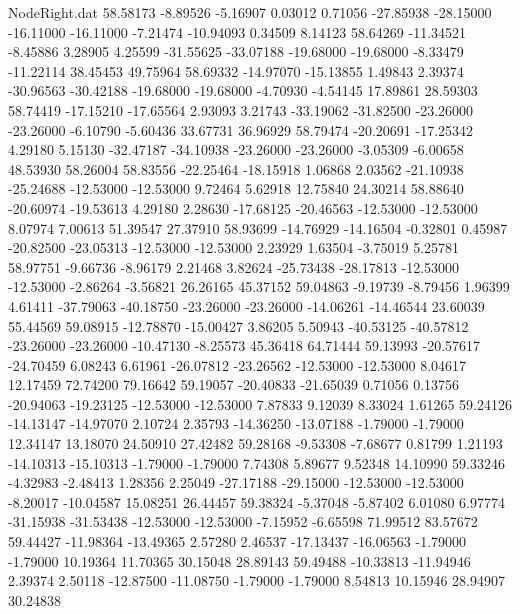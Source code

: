 \begin{filecontents}{NodeRight.dat}
  58.58173   -8.89526   -5.16907     0.03012    0.71056  -27.85938  -28.15000  -16.11000  -16.11000   -7.21474  -10.94093    0.34509    8.14123
  58.64269  -11.34521   -8.45886     3.28905    4.25599  -31.55625  -33.07188  -19.68000  -19.68000   -8.33479  -11.22114   38.45453   49.75964
  58.69332  -14.97070  -15.13855     1.49843    2.39374  -30.96563  -30.42188  -19.68000  -19.68000   -4.70930   -4.54145   17.89861   28.59303
  58.74419  -17.15210  -17.65564     2.93093    3.21743  -33.19062  -31.82500  -23.26000  -23.26000   -6.10790   -5.60436   33.67731   36.96929
  58.79474  -20.20691  -17.25342     4.29180    5.15130  -32.47187  -34.10938  -23.26000  -23.26000   -3.05309   -6.00658   48.53930   58.26004
  58.83556  -22.25464  -18.15918     1.06868    2.03562  -21.10938  -25.24688  -12.53000  -12.53000    9.72464    5.62918   12.75840   24.30214
  58.88640  -20.60974  -19.53613     4.29180    2.28630  -17.68125  -20.46563  -12.53000  -12.53000    8.07974    7.00613   51.39547   27.37910
  58.93699  -14.76929  -14.16504    -0.32801    0.45987  -20.82500  -23.05313  -12.53000  -12.53000    2.23929    1.63504   -3.75019    5.25781
  58.97751   -9.66736   -8.96179     2.21468    3.82624  -25.73438  -28.17813  -12.53000  -12.53000   -2.86264   -3.56821   26.26165   45.37152
  59.04863   -9.19739   -8.79456     1.96399    4.61411  -37.79063  -40.18750  -23.26000  -23.26000  -14.06261  -14.46544   23.60039   55.44569
  59.08915  -12.78870  -15.00427     3.86205    5.50943  -40.53125  -40.57812  -23.26000  -23.26000  -10.47130   -8.25573   45.36418   64.71444
  59.13993  -20.57617  -24.70459     6.08243    6.61961  -26.07812  -23.26562  -12.53000  -12.53000    8.04617   12.17459   72.74200   79.16642
  59.19057  -20.40833  -21.65039     0.71056    0.13756  -20.94063  -19.23125  -12.53000  -12.53000    7.87833    9.12039    8.33024    1.61265
  59.24126  -14.13147  -14.97070     2.10724    2.35793  -14.36250  -13.07188   -1.79000   -1.79000   12.34147   13.18070   24.50910   27.42482
  59.28168   -9.53308   -7.68677     0.81799    1.21193  -14.10313  -15.10313   -1.79000   -1.79000    7.74308    5.89677    9.52348   14.10990
  59.33246   -4.32983   -2.48413     1.28356    2.25049  -27.17188  -29.15000  -12.53000  -12.53000   -8.20017  -10.04587   15.08251   26.44457
  59.38324   -5.37048   -5.87402     6.01080    6.97774  -31.15938  -31.53438  -12.53000  -12.53000   -7.15952   -6.65598   71.99512   83.57672
  59.44427  -11.98364  -13.49365     2.57280    2.46537  -17.13437  -16.06563   -1.79000   -1.79000   10.19364   11.70365   30.15048   28.89143
  59.49488  -10.33813  -11.94946     2.39374    2.50118  -12.87500  -11.08750   -1.79000   -1.79000    8.54813   10.15946   28.94907   30.24838

\end{filecontents}
